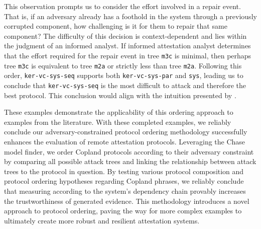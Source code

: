 \documentclass[runningheads]{llncs}
\theoremstyle{definition}
\begin{document}
This observation prompts us to consider the effort involved in a repair event. That is, if an adversary already has a foothold in the system through a previously corrupted component, how challenging is it for them to repair that same component? The difficulty of this decision is context-dependent and lies within the judgment of an informed analyst. If informed attestation analyst determines that the effort required for the repair event in tree \texttt{m3c} is minimal, then perhaps tree \texttt{m3c} is equivalent to tree \texttt{m2a} or strictly less than tree \texttt{m2a}. Following this order, \texttt{ker-vc-sys-seq} supports both \texttt{ker-vc-sys-par} and \texttt{sys}, leading us to conclude that \texttt{ker-vc-sys-seq} is the most difficult to attack and therefore the best protocol. This conclusion would align with the intuition presented by \citet{Rowe:2021:AutomatedTrust}.


These examples demonstrate the applicability of this ordering approach to examples from the literature. With these completed examples, we reliably conclude our adversary-constrained protocol ordering methodology successfully enhances the evaluation of remote attestation protocols. Leveraging the Chase model finder, we order Copland protocols according to their adversary constraint by comparing all possible attack trees and linking the relationship between attack trees to the protocol in question. By testing various protocol composition and protocol ordering hypotheses regarding Copland phrases, we reliably conclude that measuring according to the system's dependency chain provably increases the trustworthiness of generated evidence. This methodology introduces a novel approach to protocol ordering, paving the way for more complex examples to ultimately create more robust and resilient attestation systems.





%
% 
%
%
%

%

%
\end{document}
